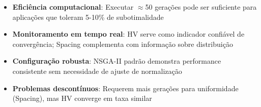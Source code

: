 \begin{itemize}
    \item \textbf{Eficiência computacional}: Executar $\approx$50 gerações pode ser suficiente para aplicações que toleram 5-10\% de subotimalidade
    
    \item \textbf{Monitoramento em tempo real}: HV serve como indicador confiável de convergência; Spacing complementa com informação sobre distribuição
    
    \item \textbf{Configuração robusta}: NSGA-II padrão demonstra performance consistente sem necessidade de ajuste de normalização
    
    \item \textbf{Problemas descontínuos}: Requerem mais gerações para uniformidade (Spacing), mas HV converge em taxa similar
\end{itemize}

